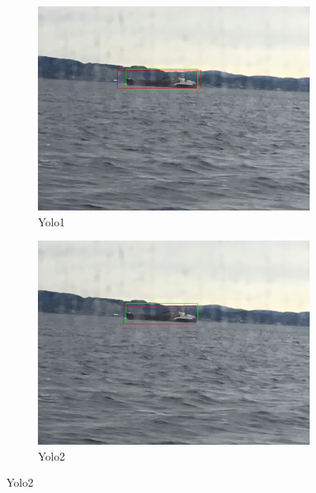 \begin{figure}[h!]
\begin{subfigure}{.5\textwidth}
  \centering
  \includegraphics[width=0.75\linewidth]{results/case_tr_moor/yolo12/yolo1/big/IMG_2537.jpg}
  \caption{Yolo1}
\end{subfigure}%
\begin{subfigure}{.5\textwidth}
  \centering
  \includegraphics[width=.75\linewidth]{results/case_tr_moor/yolo12/yolo2/big/IMG_2537.jpg}
  \caption{Yolo2}
\end{subfigure}


\end{figure}
